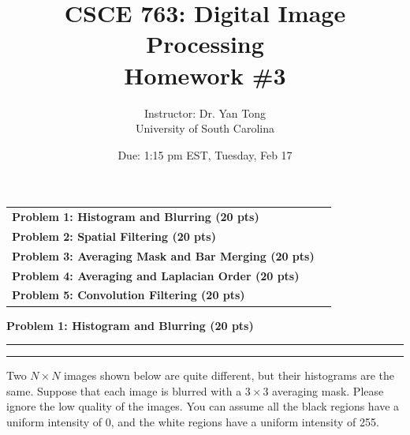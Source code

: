 \documentclass[12pt]{article}
\title{CSCE 763: Digital Image Processing \\ Homework \#3}
\author{Instructor: Dr. Yan Tong \\ University of South Carolina}
\date{Due: 1:15 pm EST, Tuesday, Feb 17}
\newcommand{\question}[1]{%
  \clearpage
  \vspace{0.5cm}
  {\noindent\normalsize \textbf{#1}}
  \vspace{0.2cm}
  \hrule
  \vspace{0.1cm}
  \hrule
  \vspace{0.3cm}
}
\begin{document}
\maketitle
\setlength{\parindent}{0pt}



\begin{center}
\begin{tcolorbox}[colback=white, colframe=gray!50!black, colbacktitle=gray!20!white,
                  coltitle=black, sharp corners, boxrule=1pt,
                  title=\Large\bfseries Table of Contents]
\begin{tabular}{p{}r}
\textbf{Problem 1: Histogram and Blurring (20 pts)} \dotfill & \textbf{\pageref{quest:1}} \\[0.3em]
\textbf{Problem 2: Spatial Filtering (20 pts)} \dotfill & \textbf{\pageref{quest:2}} \\[0.3em]
\textbf{Problem 3: Averaging Mask and Bar Merging (20 pts)} \dotfill & \textbf{\pageref{quest:3}} \\[0.3em]
\textbf{Problem 4: Averaging and Laplacian Order (20 pts)} \dotfill & \textbf{\pageref{quest:4}} \\[0.3em]
\textbf{Problem 5: Convolution Filtering (20 pts)} \dotfill & \textbf{\pageref{quest:5}} \\
\end{tabular}
\vspace{0.2cm}
\end{tcolorbox}
\end{center}

\vspace{0.5cm}


\question{Problem 1: Histogram and Blurring (20 pts)}\label{quest:1}

Two $N \times N$ images shown below are quite different, but their histograms are the same. Suppose that each image is blurred with a $3 \times 3$ averaging mask. Please ignore the low quality of the images. You can assume all the black regions have a uniform intensity of 0, and the white regions have a uniform intensity of 255.
\end{document}
